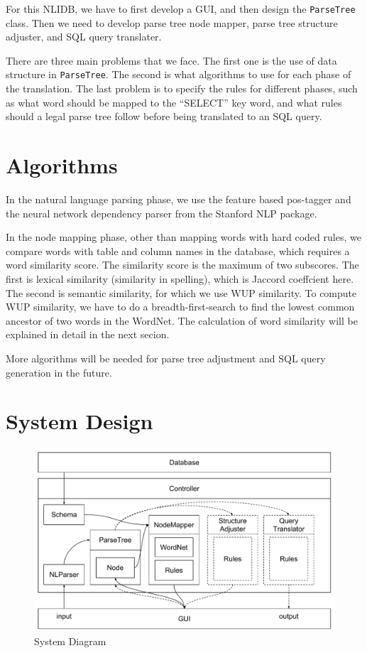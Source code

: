 \documentclass[twocolumn]{article}
\begin{document}
For this NLIDB, we have to first develop a GUI, and then design the \texttt{ParseTree} class. Then we need to develop parse tree node mapper, parse tree structure adjuster, and SQL query translater.

There are three main problems that we face. The first one is the use of data structure in \texttt{ParseTree}. The second is what algorithms to use for each phase of the translation. The last problem is to specify the rules for different phases, such as what word should be mapped to the ``SELECT'' key word, and what rules should a legal parse tree follow before being translated to an SQL query.

\section{Algorithms}

In the natural language parsing phase, we use the feature based pos-tagger\cite{toutanova2003feature} and the neural network dependency parser\cite{chen2014fast} from the Stanford NLP package.

In the node mapping phase, other than mapping words with hard coded rules, we compare words with table and column names in the database, which requires a word similarity score. The similarity score is the maximum of two subscores. The first is lexical similarity (similarity in spelling), which is Jaccord coeffcient here. The second is semantic similarity, for which we use WUP similarity\cite{wu1994verbs}. To compute WUP similarity, we have to do a breadth-first-search to find the lowest common ancestor of two words in the WordNet. The calculation of word similarity will be explained in detail in the next secion.

More algorithms will be needed for parse tree adjustment and SQL query generation in the future.

\section{System Design}

\begin{figure}[ht]
  \centering
  \includegraphics[width=0.8\linewidth]{figures/nlidb_system_diagram.pdf}
  \caption{System Diagram}
\end{figure}
\end{document}
